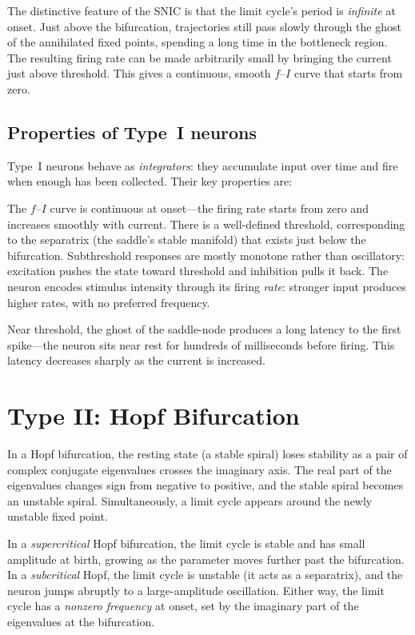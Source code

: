 The distinctive feature of the SNIC is that the limit cycle's period is \emph{infinite} at onset. Just above the bifurcation, trajectories still pass slowly through the ghost of the annihilated fixed points, spending a long time in the bottleneck region. The resulting firing rate can be made arbitrarily small by bringing the current just above threshold. This gives a continuous, smooth $f$--$I$ curve that starts from zero.

\subsection{Properties of Type~I neurons}

Type~I neurons behave as \emph{integrators}: they accumulate input over time and fire when enough has been collected. Their key properties are:

The $f$--$I$ curve is continuous at onset---the firing rate starts from zero and increases smoothly with current. There is a well-defined threshold, corresponding to the separatrix (the saddle's stable manifold) that exists just below the bifurcation. Subthreshold responses are mostly monotone rather than oscillatory: excitation pushes the state toward threshold and inhibition pulls it back. The neuron encodes stimulus intensity through its firing \emph{rate}: stronger input produces higher rates, with no preferred frequency.

Near threshold, the ghost of the saddle-node produces a long latency to the first spike---the neuron sits near rest for hundreds of milliseconds before firing. This latency decreases sharply as the current is increased.

\section{Type II: Hopf Bifurcation}
\label{sec:type-2}

In a Hopf bifurcation, the resting state (a stable spiral) loses stability as a pair of complex conjugate eigenvalues crosses the imaginary axis. The real part of the eigenvalues changes sign from negative to positive, and the stable spiral becomes an unstable spiral. Simultaneously, a limit cycle appears around the newly unstable fixed point.

In a \emph{supercritical} Hopf bifurcation, the limit cycle is stable and has small amplitude at birth, growing as the parameter moves further past the bifurcation. In a \emph{subcritical} Hopf, the limit cycle is unstable (it acts as a separatrix), and the neuron jumps abruptly to a large-amplitude oscillation. Either way, the limit cycle has a \emph{nonzero frequency} at onset, set by the imaginary part of the eigenvalues at the bifurcation.

